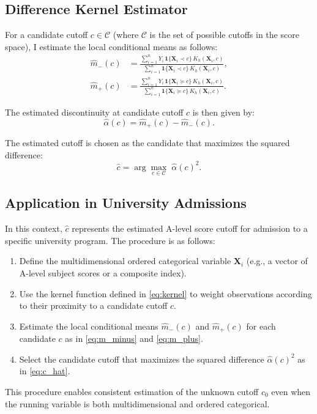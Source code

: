 \subsection*{Difference Kernel Estimator}

For a candidate cutoff \( c \in \mathcal{C} \) (where \(\mathcal{C}\) is the set of possible cutoffs in the score space), I estimate the local conditional means as follows:
\begin{align}
\hat{m}_-(c) &= \frac{\sum_{i=1}^n Y_i \, \mathbf{1}\{\bm{X}_i \prec c\} \, K_h(\bm{X}_i, c)}{\sum_{i=1}^n \mathbf{1}\{\bm{X}_i \prec c\} \, K_h(\bm{X}_i, c)}, \label{eq:m_minus}\\[1ex]
\hat{m}_+(c) &= \frac{\sum_{i=1}^n Y_i \, \mathbf{1}\{\bm{X}_i \succeq c\} \, K_h(\bm{X}_i, c)}{\sum_{i=1}^n \mathbf{1}\{\bm{X}_i \succeq c\} \, K_h(\bm{X}_i, c)}. \label{eq:m_plus}
\end{align}

The estimated discontinuity at candidate cutoff \( c \) is then given by:
\begin{equation} \label{eq:alpha_hat}
\hat{\alpha}(c) = \hat{m}_+(c) - \hat{m}_-(c).
\end{equation}

The estimated cutoff is chosen as the candidate that maximizes the squared difference:
\begin{equation} \label{eq:c_hat}
\hat{c} = \arg\max_{c \in \mathcal{C}} \; \hat{\alpha}(c)^2.
\end{equation}

\subsection*{Application in University Admissions}

In this context, \(\hat{c}\) represents the estimated A-level score cutoff for admission to a specific university program. The procedure is as follows:
\begin{enumerate}
    \item Define the multidimensional ordered categorical variable \(\bm{X}_i\) (e.g., a vector of A-level subject scores or a composite index).
    \item Use the kernel function defined in \eqref{eq:kernel} to weight observations according to their proximity to a candidate cutoff \( c \).
    \item Estimate the local conditional means \(\hat{m}_-(c)\) and \(\hat{m}_+(c)\) for each candidate \( c \) as in \eqref{eq:m_minus} and \eqref{eq:m_plus}.
    \item Select the candidate cutoff that maximizes the squared difference \(\hat{\alpha}(c)^2\) as in \eqref{eq:c_hat}.
\end{enumerate}

This procedure enables consistent estimation of the unknown cutoff \( c_0 \) even when the running variable is both multidimensional and ordered categorical.

